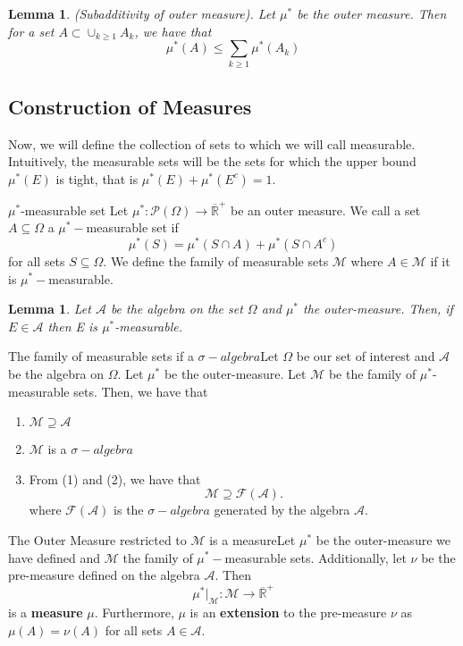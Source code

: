 \documentclass[twoside]{article}
\newtheorem{lemma}[theorem]{Lemma}
\newcommand{\algebra}{\mathcal{A}}
\newcommand{\sigmalgebra}{\mathcal{F}}
\newcommand{\sa}{\sigma-algebra}
\newcommand{\powerset}{\mathcal{P}}
\newcommand{\positiveextendedreal}{\overline{\mathbb{R}}^+}
\begin{document}
\begin{lemma}(Subadditivity of outer measure). Let $\mu^*$ be the outer measure. Then for a set $A \subset \cup_{k \geq 1}A_k$, we have that 
$$
\mu^*(A) \leq \sum_{k \geq 1}\mu^*(A_k)
$$
\end{lemma}


\subsection{Construction of Measures}

Now, we will define the collection of sets to which we will call measurable. Intuitively, the measurable sets will be the sets for which the upper bound $\mu^*(E)$ is tight, that is $\mu^*(E) + \mu^*(E^c) = 1.$


\begin{definition_exam}{$\mu^*$-measurable set}{} Let $\mu^*: \powerset(\Omega) \rightarrow \positiveextendedreal$ be an outer measure. We call a set $A \subseteq \Omega$ a $\mu^*-$measurable set if 
$$
\mu^*(S) = \mu^*(S \cap A) + \mu^*(S \cap A^c)
$$
for all sets $S \subseteq \Omega.$ We define the family of measurable sets $\mathcal{M}$ where $A \in \mathcal{M}$ if it is $\mu^*-$measurable.
\end{definition_exam}

\begin{lemma}Let $\algebra$ be the algebra on the set $\Omega$ and $\mu^*$ the outer-measure. Then, if $E \in \algebra$ then E is $\mu^*$-measurable.
\end{lemma}


\begin{proposition_exam}{The family of measurable sets if a $\sa$}{}Let $\Omega$ be our set of interest and $\algebra$ be the algebra on $\Omega$. Let $\mu^*$ be the outer-measure. Let $\mathcal{M}$ be the family of $\mu^*$-measurable sets. Then, we have that 
\begin{enumerate}
\item $\mathcal{M} \supseteq \mathcal{A}$
\item $\mathcal{M}$ is a $\sa$
\item From (1) and (2), we have that 
$$
\mathcal{M} \supseteq \sigmalgebra (\algebra).
$$
where $\sigmalgebra (\algebra)$ is the $\sa$ generated by the algebra $\algebra.$
\end{enumerate}

\end{proposition_exam}

\begin{proposition_exam}{The Outer Measure restricted to $\mathcal{M}$ is a measure}{}Let $\mu^*$ be the outer-measure we have defined and $\mathcal{M}$ the family of $\mu^*-$measurable sets. Additionally, let $\nu$ be the pre-measure defined on the algebra $\algebra.$ Then 
$$
\mu^*|_{\mathcal{M}}: \mathcal{M} \rightarrow \positiveextendedreal
$$
is a \textbf{measure} $\mu$. Furthermore, $\mu$ is an \textbf{extension} to the pre-measure $\nu$ as $\mu(A) = \nu(A)$ for all sets $A \in \algebra.$
\end{proposition_exam}
\end{document}
